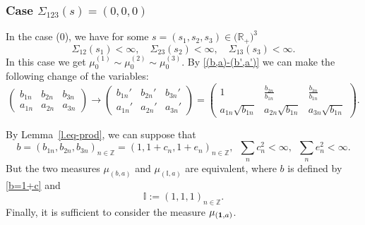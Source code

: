 \documentclass[preprint,12pt]{elsarticle}
\numberwithin{equation}{section}
\begin{document}
\subsubsection{Case $\Sigma_{123}(s)=(0,0,0)$}
In the case (0), we have  for some $s=(s_1,s_2,s_3)\in \big(\mathbb R_+\big)^3$
\begin{equation*}
\Sigma_{12}(s_1)<\infty,\quad \Sigma_{23}(s_2)<\infty,\quad\Sigma_{13}(s_3)<\infty. 
\end{equation*}
In this case we get $\mu_0^{(1)}\sim\mu_0^{(2)}\sim\mu_0^{(3)}.$
By \eqref{(b,a)-(b',a')} we can make the following change of the variables:
\begin{equation*}
\left(\begin{smallmatrix}
b_{1n}&b_{2n}&b_{3n}\\
a_{1n}&a_{2n}&a_{3n}
\end{smallmatrix}
\right)\to
\left(\begin{smallmatrix}
b_{1n}'&b_{2n}'&b_{3n}'\\
a_{1n}'&a_{2n}'&a_{3n}'
\end{smallmatrix}
\right)=
\left(\begin{smallmatrix}
1&\frac{b_{2n}}{b_{1n}}&\frac{b_{3n}}{b_{1n}}\\
a_{1n}\sqrt{b_{1n}}&a_{2n}\sqrt{b_{1n}}&a_{3n}\sqrt{b_{1n}}
\end{smallmatrix}
\right).
\end{equation*}
\begin{rem}
\label{r.Sigma-123=(000)} 
By Lemma~\ref{l.eq-prod}, we can suppose that 
\begin{equation}
 \label{b=1+c}
b\!=\!(b_{1n},b_{2n},b_{3n})_{n\in \mathbb Z}\!=\!(1,1+c_n,1+e
_n)_{n\in \mathbb Z},\,\,\,
\sum_nc_n^2<\infty,\,\,\,
\sum_ne_n^2<\infty.
\end{equation}
But the two measures 
$\mu_{(b,a)}$ and $\mu_{({\mathbb I},a)}$ are equivalent, where $b$ is defined by \eqref{b=1+c} and 
\begin{equation}
 \label{bf I}
{\mathbb I}:=(1,1,1)_{n\in \mathbb Z}.
\end{equation}
Finally, it is sufficient to consider the measure $\mu_{({\bf 1},a)}$. 
\end{rem}
\end{document}
